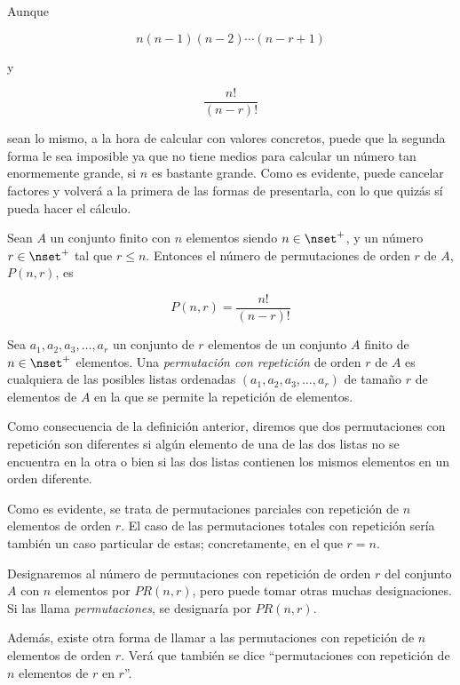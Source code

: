 Aunque

$$ n(n - 1)(n - 2) \cdots (n - r + 1) $$

\noindent y

$$ \frac{n!}{(n - r)!} $$

\noindent sean lo mismo, a la hora de calcular con valores concretos, puede
que la segunda forma le sea imposible ya que no tiene medios para calcular
un número tan enormemente grande, si $n$ es bastante grande. Como es
evidente, puede cancelar factores y volverá a la primera de las formas de
presentarla, con lo que quizás sí pueda hacer el cálculo.

\begin{corollary}
  Sean $A$ un conjunto finito con $n$ elementos siendo $n \in \nset^{+}$, y
  un número $r \in \nset^{+}$ tal que $r \leq n$. Entonces el número de
  permutaciones de orden $r$ de $A$, $P(n, r)$, es

  $$ P(n, r) = \frac{n!}{(n - r)!} $$
\end{corollary}

\begin{deffinition}
  Sea $a_1, a_2, a_3, \ldots, a_r$ un conjunto de $r$ elementos de un
  conjunto $A$ finito de $n \in \nset^{+}$ elementos. Una \emph{permutación con
  repetición} de orden $r$ de $A$ es cualquiera de las posibles listas
  ordenadas $(a_1, a_2, a_3, \ldots, a_r)$ de tamaño $r$ de elementos de $A$
  en la que se permite la repetición de elementos.
\end{deffinition}

Como consecuencia de la definición anterior, diremos que dos permutaciones
con repetición son diferentes si algún elemento de una de las dos listas no
se encuentra en la otra o bien si las dos listas contienen los mismos
elementos en un orden diferente.

Como es evidente, se trata de permutaciones parciales con repetición de $n$
elementos de orden $r$. El caso de las permutaciones totales con repetición
sería también un caso particular de estas; concretamente, en el que $r = n$.

Designaremos al número de permutaciones con repetición de orden $r$ del
conjunto $A$ con $n$ elementos por $PR(n, r)$, pero puede tomar otras muchas
designaciones. Si las llama \emph{permutaciones}, se designaría por $PR(n, r)$.

Además, existe otra forma de llamar a las permutaciones con repetición de $n$
elementos de orden $r$. Verá que también se dice ``permutaciones con
repetición de $n$ elementos de $r$ en $r$''.

